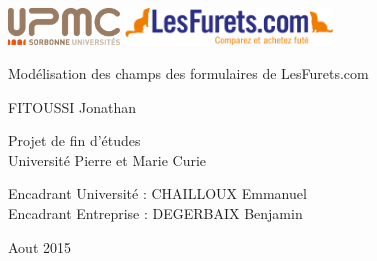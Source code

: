 \thispagestyle{empty}
{
\sffamily
\centering
\Large

~\vspace{\fill}
\begin{center}
\includegraphics[height=1cm]{upmc.png}
\hspace{2cm}
\includegraphics[height=1cm]{lesfurets.png}
\end{center}
{\huge 
Modélisation des champs des formulaires de LesFurets.com
}

\vspace{2.5cm}

{\LARGE
FITOUSSI Jonathan
}

\vspace{3.5cm}

Projet de fin d'études\\[1em]
Université Pierre et Marie Curie

\vspace{3.5cm}

Encadrant Université : CHAILLOUX Emmanuel\\
Encadrant Entreprise : DEGERBAIX Benjamin

\vspace{\fill}
\begin{center}
Aout 2015
\end{center}
}

